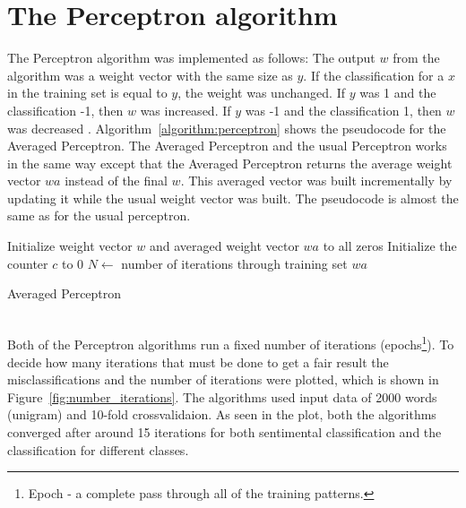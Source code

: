 \section{The Perceptron algorithm}
The Perceptron algorithm was implemented as follows:
The output $w$ from the algorithm was a weight vector with the same size as $y$. If the classification for a $x$ in the training set is equal to $y$, the weight was unchanged.
If $y$ was 1 and the classification -1, then $w$ was increased. If $y$ was -1 and the classification 1, then $w$ was decreased \citep{perceptron_ai}. Algorithm~\ref{algorithm:perceptron} shows the pseudocode for the Averaged Perceptron. The Averaged Perceptron and the usual Perceptron works in the same way except that the Averaged Perceptron returns the average weight vector $wa$ instead of the final $w$.
This averaged vector was built incrementally by updating it while the usual weight vector was built. The pseudocode is almost the same as for the usual perceptron.
\begin{algorithm}[h!]
 \SetAlgoLined
 Initialize weight vector $w$ and averaged weight vector $wa$ to all zeros\;
 Initialize the counter $c$ to 0\;
 $N \leftarrow$ number of iterations through training set\;
 \Return $wa$
 \caption{Averaged Perceptron}
 \label{algorithm:perceptron}
\end{algorithm} \\
Both of the Perceptron algorithms run a fixed number of iterations (epochs\footnote{Epoch - a complete pass through all of the training patterns.}). To decide how many iterations that must be done to get a fair result the misclassifications and the number of iterations were plotted, which is shown in Figure~\ref{fig:number_iterations}. The algorithms used input data of 2000 words (unigram) and 10-fold crossvalidaion. As seen in the plot, both the algorithms converged after around 15 iterations for both sentimental classification and the classification for different classes. 
